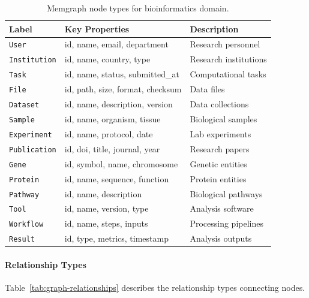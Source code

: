 \begin{table}[htbp]
    \centering
    \caption{Memgraph node types for bioinformatics domain.}
    \label{tab:graph-nodes}
    \small
    \begin{tabularx}{\textwidth}{llX}
        \toprule
        \textbf{Label} & \textbf{Key Properties} & \textbf{Description} \\
        \midrule
        \texttt{User} & id, name, email, department & Research personnel \\
        \texttt{Institution} & id, name, country, type & Research institutions \\
        \texttt{Task} & id, name, status, submitted\_at & Computational tasks \\
        \texttt{File} & id, path, size, format, checksum & Data files \\
        \texttt{Dataset} & id, name, description, version & Data collections \\
        \texttt{Sample} & id, name, organism, tissue & Biological samples \\
        \texttt{Experiment} & id, name, protocol, date & Lab experiments \\
        \texttt{Publication} & id, doi, title, journal, year & Research papers \\
        \texttt{Gene} & id, symbol, name, chromosome & Genetic entities \\
        \texttt{Protein} & id, name, sequence, function & Protein entities \\
        \texttt{Pathway} & id, name, description & Biological pathways \\
        \texttt{Tool} & id, name, version, type & Analysis software \\
        \texttt{Workflow} & id, name, steps, inputs & Processing pipelines \\
        \texttt{Result} & id, type, metrics, timestamp & Analysis outputs \\
        \bottomrule
    \end{tabularx}
\end{table}

\paragraph{Relationship Types}
Table~\ref{tab:graph-relationships} describes the relationship types connecting nodes.

